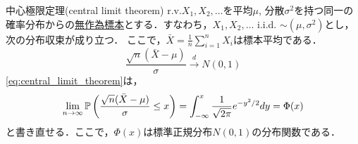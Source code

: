 \documentclass[main.tex]{subfiles}
\begin{document}
\begin{mytheorem}{中心極限定理(central limit theorem)}
\label{thm:central_limit_theorem} %
  r.v.$X_1, X_2, \dots$を平均$\mu$, 分散$\sigma^2$を持つ同一の確率分布からの\hyperref[def:random_sample]{無作為標本}とする．すなわち，$X_1, X_2, \dots$ i.i.d. $\sim (\mu, \sigma^2)$とし，次の分布収束が成り立つ．
  ここで，$\bar{X} = \frac{1}{n} \sum_{i=1}^{n} X_i$は標本平均である．
  \begin{equation}
    \frac{\sqrt{n}(\bar{X} - \mu)}{\sigma} \xrightarrow{d} N(0,1)
    \label{eq:central_limit_theorem}
  \end{equation}
  \eqref{eq:central_limit_theorem}は，
  \begin{equation}
    \lim_{n \to \infty} \mathbb{P}\left(\frac{\sqrt{n}(\bar{X} - \mu)}{\sigma} \leq x\right) = \int_{-\infty}^{x} \frac{1}{\sqrt{2\pi}} e^{-y^2/2} dy = \Phi(x)
  \end{equation}
  と書き直せる．ここで，$\Phi(x)$は標準正規分布$N(0,1)$の分布関数である．
\end{mytheorem}
\end{document}
